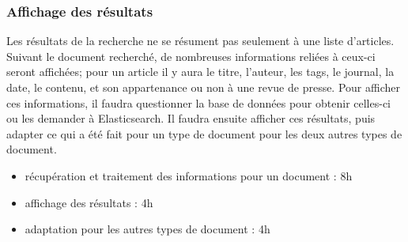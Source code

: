 	\subsubsection{Affichage des résultats} 
	\label{subsec:rech_result}
		Les résultats de la recherche ne se résument pas seulement à une liste d'articles. Suivant le document recherché, de nombreuses informations reliées à ceux-ci seront affichées; pour un article il y aura le titre, l'auteur, les tags, le journal, la date, le contenu, et son appartenance ou non à une revue de presse. Pour afficher ces informations, il faudra questionner la base de données pour obtenir celles-ci ou les demander à Elasticsearch. Il faudra ensuite afficher ces résultats, puis adapter ce qui a été fait pour un type de document pour les deux autres types de document.

		\begin{itemize}
			\item récupération et traitement des informations pour un document : 8h
			\item affichage des résultats : 4h
			\item adaptation pour les autres types de document : 4h
		\end{itemize}

